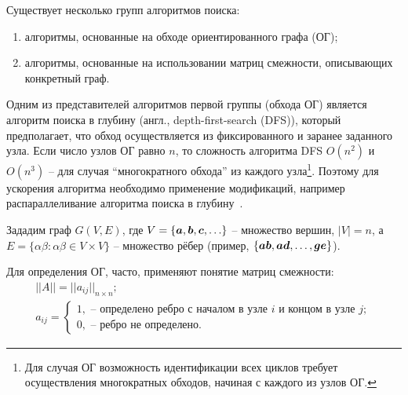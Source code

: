 \def\notedate{2021.11.14}
\def\currentauthor{Муха В. (РК6-73Б)}

Существует несколько групп алгоритмов поиска\cite{davidrajuh2016}:
\begin{enumerate}[label=\arabic*)]
    \item алгоритмы, основанные на обходе ориентированного графа (ОГ);
    \item алгоритмы, основанные на использовании матриц смежности, описывающих конкретный граф.
\end{enumerate}

Одним из представителей алгоритмов первой группы (обхода ОГ) является алгоритм поиска в глубину (англ., depth-first-search (DFS)), который предполагает, что обход осуществляется из фиксированного и заранее заданного узла. Если число узлов ОГ равно $n$, то сложность алгоритма DFS $O(n^2)$ и $O(n^3)$ -- для случая ``многократного обхода'' из каждого узла\footnote{Для случая ОГ возможность идентификации всех циклов требует осуществления многократных обходов, начиная с каждого из узлов ОГ.}. Поэтому для ускорения алгоритма необходимо применение модификаций, например распараллеливание алгоритма поиска в глубину~\cite{Mahdi2011}.

Зададим граф $G(V, E)$, где $V = \{\boldsymbol{a}, \boldsymbol{b}, \boldsymbol{c}, \ldots\}$ -- множество вершин, $|V|=n$, а $E = \{\alpha\beta: \alpha\beta\in V\times V\}$ -- множество рёбер (пример, $\{\boldsymbol{ab}, \boldsymbol{ad}, \ldots , \boldsymbol{ge}\}$).

Для определения ОГ, часто, применяют понятие матриц смежности\cite{diestel2012graph}:
\begin{equation}\label{eq.rndhpcpar.2021.11.14.01}
\begin{array}{l}
||A||=||a_{ij}||_{n\times n};\\
a_{ij}=\left\{\begin{array}{l} 1, \mbox{ -- определено ребро с началом в узле $i$ и концом в узле $j$};\\ 0, \mbox{ -- ребро не определено}.\end{array} \right.
\end{array}
\end{equation}

